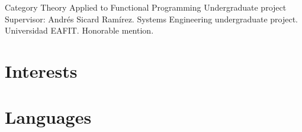 \documentclass[12pt,letterpaper,sans]{moderncv}
\begin{document}
  {Category Theory Applied to Functional Programming}
  {Undergraduate project}
  {}
  {}
  {
    Supervisor: Andrés Sicard Ramírez. Systems Engineering
    undergraduate project. Universidad EAFIT. Honorable mention.
  }

\section{Interests}


\section{Languages}

\end{document}
